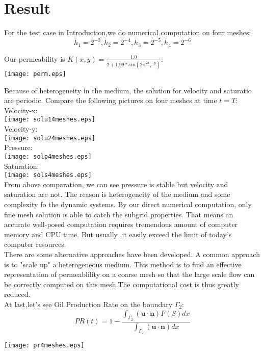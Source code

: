 \documentclass[12pt]{article}
\begin{document}
\section{Result}

For the test case in Introduction,we do numerical computation on four meshes:
$$h_{1}=2^{-3}, h_{2}=2^{-4}, h_{3}=2^{-5}, h_{4}=2^{-6}$$

Our permeability is $K(x,y)=\frac{1.0}{2+1.99*sin(2 \pi \frac{2x-y}{\epsilon})}$:\\

\texttt{[image: perm.eps]}

Because of heterogeneity in the medium, the solution for velocity and saturatio are periodic.
Compare the following pictures on four meshes at time $t=T$:\\
Velocity-x:\\
\texttt{[image: solu14meshes.eps]}
\\
Velocity-y:\\
\texttt{[image: solu24meshes.eps]}
\\
Pressure:\\
\texttt{[image: solp4meshes.eps]}
\\
Saturation:\\
\texttt{[image: sols4meshes.eps]}
\\
From above comparation, we can see pressure is stable but velocity and saturation are not. 
The reason is heterogeneity of the medium and some complexity fo the dynamic systems.
By our direct numerical computation, only fine mesh solution is able to catch the subgrid properties.
That means an accurate well-posed computation requires tremendous amount of computer memory and CPU time. 
But usually ,it easily exceed the limit of today's computer resources.\\
There are some alternative approaches have been developed. A common approach is to "scale up" a heterogeneous medium. 
This method is to find an effective representation of permeablility on a coarse mesh so that the large scale flow can be correctly computed on this mesh.The computational cost is thus greatly reduced.
\\
At last,let's see Oil Production Rate on the boundary $\Gamma_{2}$:
$$ PR(t)=1-\frac{\int_{\Gamma_{2}} (\mathbf{u}\cdot \mathbf{n})F(S)dx}{\int_{\Gamma_{2}} (\mathbf{u} \cdot \mathbf{n})dx}$$

\texttt{[image: pr4meshes.eps]}
\end{document}
